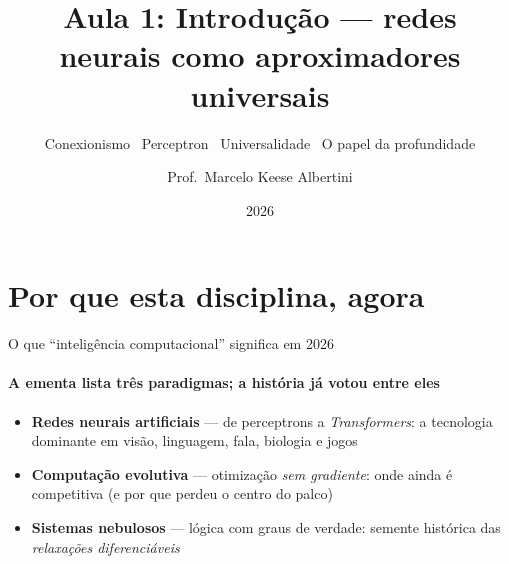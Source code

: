 \documentclass[aspectratio=169, 11pt]{beamer}
\title[Aula 1 — Introdução]{Aula 1: Introdução — redes neurais como aproximadores universais}
\subtitle[GBC073 — Inteligência Computacional]{Conexionismo \textbullet\ Perceptron \textbullet\ Universalidade \textbullet\ O papel da profundidade}
\author[Prof.\ Marcelo Albertini]{Prof.\ Marcelo Keese Albertini}
\institute{GBC073 — Inteligência Computacional \textbullet\ Universidade Federal de Uberlândia}
\date{2026}
\begin{document}
\begin{frame}
  \titlepage
\end{frame}

\section{Por que esta disciplina, agora}

\begin{frame}{O que ``inteligência computacional'' significa em 2026}
  \framesubtitle{A ementa lista três paradigmas; a história já votou entre eles}

  \begin{itemize}\setlength{\itemsep}{0.3ex}
    \item<1-> {\color{icNeural}\textbf{Redes neurais artificiais}} — de perceptrons
          a \emph{Transformers}: a \alert{tecnologia dominante} em visão,
          linguagem, fala, biologia e jogos
    \item<2-> {\color{icEvol}\textbf{Computação evolutiva}} — otimização
          \emph{sem gradiente}: onde ainda é competitiva (e por que
          perdeu o centro do palco)
    \item<3-> {\color{icFuzzy}\textbf{Sistemas nebulosos}} — lógica com graus de
          verdade: semente histórica das \emph{relaxações diferenciáveis}
  \end{itemize}

\end{frame}
\end{document}
